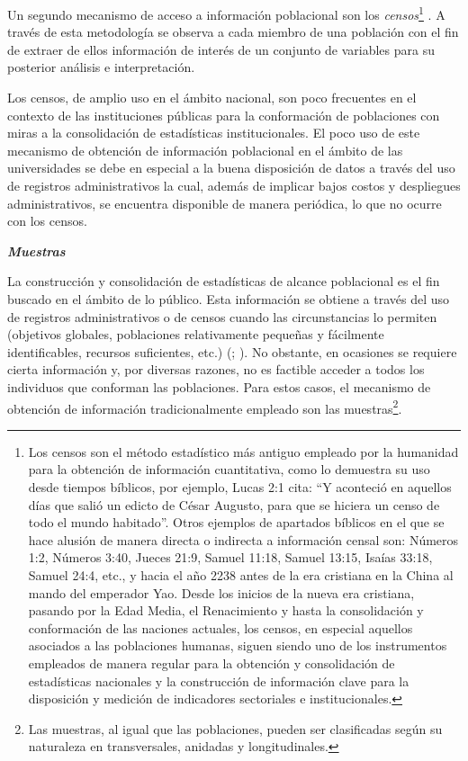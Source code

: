 \documentclass[
]{book}
\begin{document}
Un segundo mecanismo de acceso a información poblacional son los \emph{censos}\footnote{Los censos son el método estadístico más antiguo empleado por la humanidad para la obtención de información cuantitativa, como lo demuestra su uso desde tiempos bíblicos, por ejemplo, Lucas 2:1 cita: ``Y aconteció en aquellos días que salió un edicto de César Augusto, para que se hiciera un censo de todo el mundo habitado''. Otros ejemplos de apartados bíblicos en el que se hace alusión de manera directa o indirecta a información censal son: Números 1:2, Números 3:40, Jueces 21:9, Samuel 11:18, Samuel 13:15, Isaías 33:18, Samuel 24:4, etc., y hacia el año 2238 antes de la era cristiana en la China al mando del emperador Yao. Desde los inicios de la nueva era cristiana, pasando por la Edad Media, el Renacimiento y hasta la consolidación y conformación de las naciones actuales, los censos, en especial aquellos asociados a las poblaciones humanas, siguen siendo uno de los instrumentos empleados de manera regular para la obtención y consolidación de estadísticas nacionales y la construcción de información clave para la disposición y medición de indicadores sectoriales e institucionales.} . A través de esta metodología se observa a cada miembro de una población con el fin de extraer de ellos información de interés de un conjunto de variables para su posterior análisis e interpretación.

Los censos, de amplio uso en el ámbito nacional, son poco frecuentes en el contexto de las instituciones públicas para la conformación de poblaciones con miras a la consolidación de estadísticas institucionales. El poco uso de este mecanismo de obtención de información poblacional en el ámbito de las universidades se debe en especial a la buena disposición de datos a través del uso de registros administrativos la cual, además de implicar bajos costos y despliegues administrativos, se encuentra disponible de manera periódica, lo que no ocurre con los censos.

\textbf{\emph{Muestras}}

La construcción y consolidación de estadísticas de alcance poblacional es el fin buscado en el ámbito de lo público. Esta información se obtiene a través del uso de registros administrativos o de censos cuando las circunstancias lo permiten (objetivos globales, poblaciones relativamente pequeñas y fácilmente identificables, recursos suficientes, etc.) (\citet{sarndal2003model}; \citet{soto1996fundamentos}). No obstante, en ocasiones se requiere cierta información y, por diversas razones, no es factible acceder a todos los individuos que conforman las poblaciones. Para estos casos, el mecanismo de obtención de información tradicionalmente empleado son las muestras\footnote{Las muestras, al igual que las poblaciones, pueden ser clasificadas según su naturaleza en transversales, anidadas y longitudinales.}.
\end{document}
